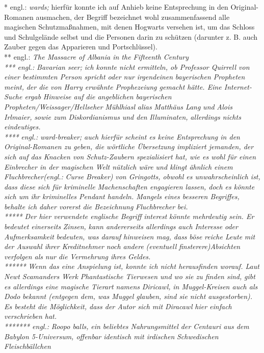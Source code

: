 {* engl.: \emph{wards;} hierfür konnte ich auf Anhieb keine Entsprechung in den Original-Romanen ausmachen, der Begriff bezeichnet wohl zusammenfassend alle magischen Schutzmaßnahmen, mit denen Hogwarts versehen ist, um das Schloss und Schulgelände selbst und die Personen darin zu schützen (darunter z. B. auch Zauber gegen das Apparieren und Portschlüssel).\\ ** engl.: \emph{The Massacre of Albania in the Fifteenth Century}\\ \emph{*** engl.:} \emph{\emph{Bavarian seer;}} \emph{ich konnte nicht ermitteln, ob Professor Quirrell von einer bestimmten Person spricht oder nur irgendeinen} \emph{bayerischen Propheten meint,} \emph{der die von Harry erwähnte Prophezeiung gemacht hätte. Eine Internet-Suche ergab} \emph{Hinweise auf die angeblichen bayerischen Propheten/Weissager/Hellseher} \emph{\emph{Mühlhiasl}} \emph{alias} \emph{\emph{Matthäus Lang}} \emph{und} \emph{\emph{Alois Irlmaier,}} \emph{sowie zum} \emph{\emph{Diskordianismus}} \emph{und den} \emph{\emph{Illuminaten,}} \emph{allerdings nichts eindeutiges.}\\ \emph{****} \emph{engl.:} \emph{\emph{ward-breaker;}} \emph{auch hierfür scheint es keine Entsprechung in den Original-Romanen zu geben, die wörtliche Übersetzung impliziert jemanden, der sich auf das Knacken von Schutz-Zaubern spezialisiert hat, wie es wohl für einen Einbrecher in der magischen Welt nützlich wäre und klingt ähnlich einem} \emph{\emph{Fluchbrecher}(engl.:} \emph{\emph{Curse Breaker})} \emph{von Gringotts, obwohl es unwahrscheinlich ist, dass diese sich für kriminelle Machenschaften engagieren lassen, doch es könnte sich um ihr kriminelles Pendant handeln. Mangels eines besseren Begriffes, behalte ich daher vorerst die Bezeichnung} \emph{\emph{Fluchbrecher}} \emph{bei.}\\ \emph{*****} \emph{Der hier verwendete englische Begriff} \emph{\emph{interest}} \emph{könnte mehrdeutig sein. Er bedeutet einerseits} \emph{\emph{Zinsen,}} \emph{kann andererseits allerdings auch} \emph{\emph{Interesse}} \emph{oder} \emph{\emph{Aufmerksamkeit}} \emph{bedeuten, was darauf hinweisen mag, dass} \emph{\emph{böse}} \emph{reiche Leute} \emph{mit der Auswahl ihrer Kredit\emph{nehmer}} \emph{noch andere} \emph{(eventuell} \emph{finsterere)Absichten} \emph{verfolgen als} \emph{nur} \emph{die Vermehrung ihres Geldes.}\\ \emph{******} \emph{Wenn das eine Anspielung ist, konnte ich nicht herausfinden worauf. Laut Newt Scamanders Werk} \emph{\emph{Phantastische Tierwesen und wo sie zu finden sind,}} \emph{gibt es allerdings eine magische Tierart namens} \emph{\emph{Diricawl,}} \emph{in Muggel-Kreisen auch als} \emph{\emph{Dodo}} \emph{bekannt (entgegen dem, was Muggel glauben, sind sie nicht ausgestorben). Es besteht die Möglichkeit, dass der Autor sich mit} \emph{\emph{Diracawl}} \emph{hier einfach verschrieben hat.}\\ \emph{******* engl.:} \emph{\emph{Roopo balls,}} \emph{ein beliebtes Nahrungsmittel der Centauri aus dem} \emph{\emph{Babylon 5}-Universum, offenbar identisch mit irdischen} \emph{\emph{Schwedischen Fleischbällchen}} }
